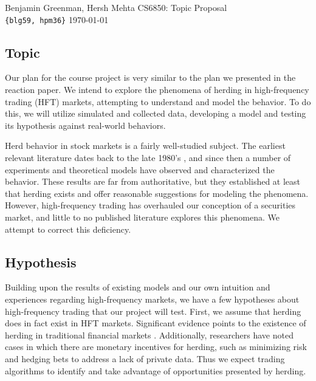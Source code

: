 \documentclass{article}
\renewcommand\maketitle{
\begin{flushleft}
{%
\large{%
Benjamin Greenman,
Hersh Mehta
\hfill
CS6850: Topic Proposal
\\\texttt{\{blg59, hpm36\}} \hfill \today
}}\\
\hrulefill
\end{flushleft}
}
\begin{document}
\maketitle


\subsection*{Topic}
Our plan for the course project is very similar to the plan we presented in the reaction paper. 
We intend to explore the phenomena of herding in high-frequency trading (HFT) markets, attempting to understand and model the behavior. 
To do this, we will utilize simulated and collected data, developing a model and testing its hypothesis against real-world behaviors. 

Herd behavior in stock markets is a fairly well-studied subject.
The earliest relevant literature dates back to the late 1980's \cite{bikhchandani}, and since then a number of experiments and theoretical models have observed and characterized the behavior.
These results are far from authoritative, but they established at least that herding exists and offer reasonable suggestions for modeling the phenomena.
However, high-frequency trading has overhauled our conception of a securities market, and little to no published literature explores this phenomena.
We attempt to correct this deficiency.

\subsection*{Hypothesis}
Building upon the results of existing models and our own intuition and experiences regarding high-frequency markets, we have a few hypotheses about high-frequency trading that our project will test.
First, we assume that herding does in fact exist in HFT markets.
Significant evidence points to the existence of herding in traditional financial markets \cite{scharfstein1990herd,grinblatt1995momentum,devenow1996rational,golec1997herding,sias2004institutional}.
Additionally, researchers have noted cases in which there are monetary incentives for herding, such as minimizing risk and hedging bets to address a lack of private data.
Thus we expect trading algorithms to identify and take advantage of opportunities presented by herding. 
\end{document}
